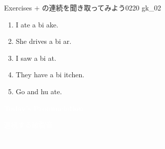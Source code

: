 \documentclass[aspectratio=169,xcolor={dvipsnames,table}]{beamer}
\begin{document}
\begin{frame}[plain]{Exercises }
   $+$  の連続を聞き取ってみよう\hfill{\tiny 0220}\,{\scriptsize {}\,gk\_02}

  \Large
  \begin{enumerate}
    \item<2-> I ate a bi  ake.
    \item<4-> She drives a bi  ar.
    \item<6-> I saw a bi  at.
    \item<8-> They have a bi  itchen.
    \item<10-> Go and hu  ate.
  \end{enumerate}

\end{frame}
\begin{frame}
  \centering
  \textcolor{white}{\Huge\bfseries Today's Pronunciation}

  \vspace{30pt}

  \textcolor{white}{\Large 連続する破裂音}

  \textcolor{white}{\Large {} $+$ }

\end{frame}
\end{document}
